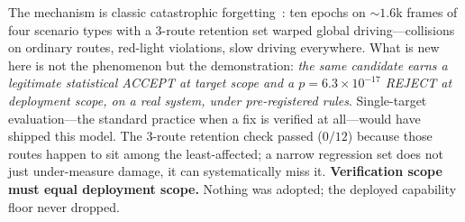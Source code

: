 \documentclass{article}
\begin{document}
The mechanism is classic catastrophic forgetting~\citep{mccloskey1989catastrophic,french1999catastrophic}:
ten epochs on ${\sim}1.6$k frames of four scenario types with a 3-route retention set warped global
driving---collisions on ordinary routes, red-light violations, slow driving everywhere. What is new here
is not the phenomenon but the demonstration: \emph{the same candidate earns a legitimate statistical
ACCEPT at target scope and a $p=6.3\times10^{-17}$ REJECT at deployment scope, on a real system, under
pre-registered rules}. Single-target evaluation---the standard practice when a fix is verified at
all---would have shipped this model. The 3-route retention check passed ($0/12$) because those routes
happen to sit among the least-affected; a narrow regression set does not just under-measure damage, it
can systematically miss it. \textbf{Verification scope must equal deployment scope.} Nothing was
adopted; the deployed capability floor never dropped.
\end{document}
